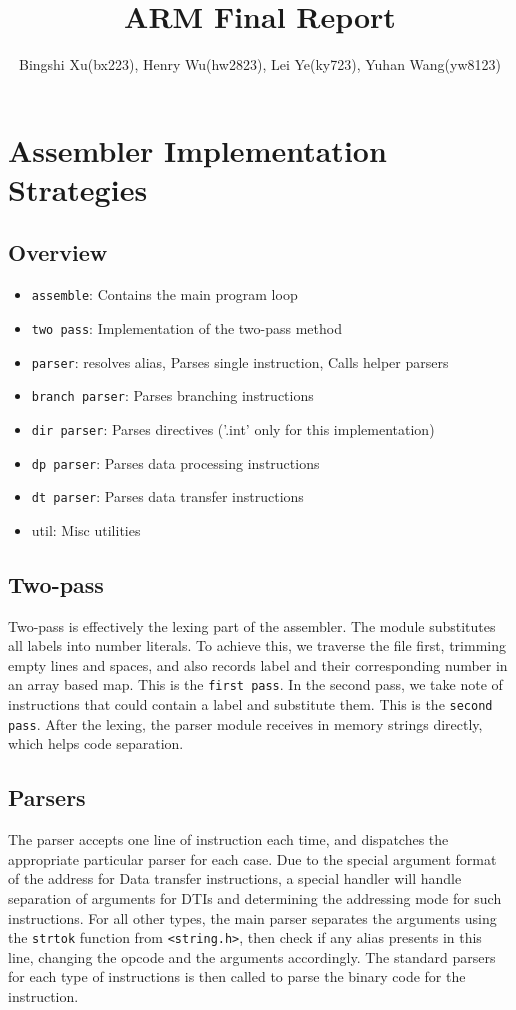 \documentclass[11pt]{article}
\begin{document}
\title{ARM Final Report}
\author{Bingshi Xu(bx223), Henry Wu(hw2823), Lei Ye(ky723), Yuhan Wang(yw8123)}

\maketitle

\section{Assembler Implementation Strategies}
\subsection{Overview}
\begin{itemize}
	\item \texttt{assemble}: Contains the main program loop
	\item \texttt{two pass}: Implementation of the two-pass method
	\item \texttt{parser}: resolves alias, Parses single instruction, Calls helper parsers
	\item \texttt{branch parser}: Parses branching instructions
	\item \texttt{dir parser}: Parses directives ('.int' only for this implementation)
	\item \texttt{dp parser}: Parses data processing instructions
	\item \texttt{dt parser}: Parses data transfer instructions
	\item util: Misc utilities
\end{itemize}

\subsection{Two-pass}
Two-pass is effectively the lexing part of the assembler. The module
substitutes all labels into number literals. To achieve this, we traverse the
file first, trimming empty lines and spaces, and also records label and their
corresponding number in an array based map. This is the \texttt{first pass}. In
the second pass, we take note of instructions that could contain a label and
substitute them. This is the \texttt{second pass}. After the lexing, the parser
module receives in memory strings directly, which helps code separation.

\subsection{Parsers}
The parser accepts one line of instruction each time, and dispatches the
appropriate particular parser for each case. Due to the special argument format
of the address for Data transfer instructions, a special handler will handle
separation of arguments for DTIs and determining the addressing mode for such
instructions. For all other types, the main parser separates the arguments
using the \texttt{strtok} function from \texttt{<string.h>}, then check if any
alias presents in this line, changing the opcode and the arguments accordingly.
The standard parsers for each type of instructions is then called to parse the
binary code for the instruction.
\end{document}
